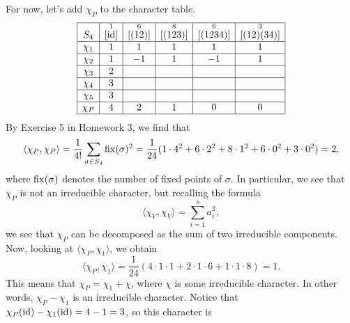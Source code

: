 \begin{exmp}{}
    For now, let's add $\chi_P$ to the character table. 
    \begin{align*}
        \begin{array}{|c|c|c|c|c|c|}
            \hline
            S_4    & \overset{1}{[\operatorname{id}]} & \overset{6}{[(12)]} & \overset{8}{[(123)]} & \overset{6}{[(1234)]} & \overset{3}{[(12)(34)]} \\ \hline
            \chi_1 & 1                  & 1                   & 1                    & 1                     & 1                       \\ \hline
            \chi_2 & 1                  & -1                  & 1                    & -1                    & 1                       \\ \hline
            \chi_3 & 2                  &                     &                      &                       &                         \\ \hline
            \chi_4 & 3                  &                     &                      &                       &                         \\ \hline
            \chi_5 & 3                  &                     &                      &                       &                         \\ \hline
            \chi_P & 4                  & 2                   & 1                    & 0                     & 0                       \\ \hline 
        \end{array} 
    \end{align*}
    By Exercise 5 in Homework 3, we find that 
    \[ \langle \chi_P, \chi_P \rangle = \frac1{4!} \sum_{\sigma \in S_4} 
    \operatorname{fix}(\sigma)^2 = \frac1{24} (1 \cdot 4^2 + 6 \cdot 2^2 + 8 \cdot 1^2 + 6 
    \cdot 0^2 + 3 \cdot 0^2) = 2, \] 
    where $\operatorname{fix}(\sigma)$ denotes the number of fixed points of $\sigma$. 
    In particular, we see that $\chi_P$ is not an irreducible character, 
    but recalling the formula 
    \[ \langle \chi_V, \chi_V \rangle = \sum_{i=1}^s a_i^2, \] 
    we see that $\chi_P$ can be decomposed as the sum of two irreducible components. 
    Now, looking at $\langle \chi_P, \chi_1 \rangle$, we obtain 
    \[ \langle \chi_P, \chi_1 \rangle = \frac1{24} (4 \cdot 1 \cdot 1 
    + 2 \cdot 1 \cdot 6 + 1 \cdot 1 \cdot 8) = 1. \] 
    This means that $\chi_P = \chi_1 + \chi$, where $\chi$ is some irreducible 
    character. In other words, $\chi_P - \chi_1$ is an irreducible character. 
    Notice that $\chi_P(\operatorname{id}) - \chi_1(\operatorname{id}) = 4 - 1 = 3$, so this character is 

\end{exmp}
